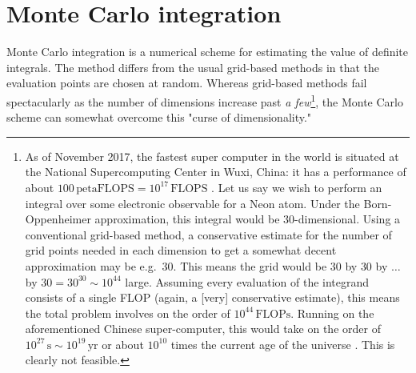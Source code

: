 \documentclass[../../master.tex]{subfiles}
\begin{document}
\section{Monte Carlo integration}
Monte Carlo integration is a numerical scheme for estimating the value of definite integrals. The method differs from the usual grid-based methods in that the evaluation points are chosen at random. Whereas grid-based methods fail spectacularly as the number of dimensions increase past \emph{a few}\footnote{As of November 2017, the fastest super computer in the world is situated at the National Supercomputing Center in Wuxi, China: it has a performance of about $100 \,\text{petaFLOPS}=10^{17}\,\text{FLOPS}$ \cite{top500}. Let us say we wish to perform an integral over some electronic observable for a Neon atom. Under the Born-Oppenheimer approximation, this integral would be $30$-dimensional. Using a conventional grid-based method, a conservative estimate for the number of grid points needed in each dimension to get a somewhat decent approximation may be e.g.\ $30$. This means the grid would be $30$ by $30$ by $\dots$ by $30=30^{30}\sim 10^{44}$ large. Assuming every evaluation of the integrand consists of a single FLOP (again, a [very] conservative estimate), this means the total problem involves on the order of $10^{44}\,\text{FLOPs}$. Running on the aforementioned Chinese super-computer, this would take on the order of $10^{27}\,\text{s}\sim 10^{19}\,\text{yr}$ or about $10^{10}$ times the current age of the universe \cite{hjorth-jensen}. This is clearly not feasible.}, the Monte Carlo scheme can somewhat overcome this "curse of dimensionality." 






























\end{document}
